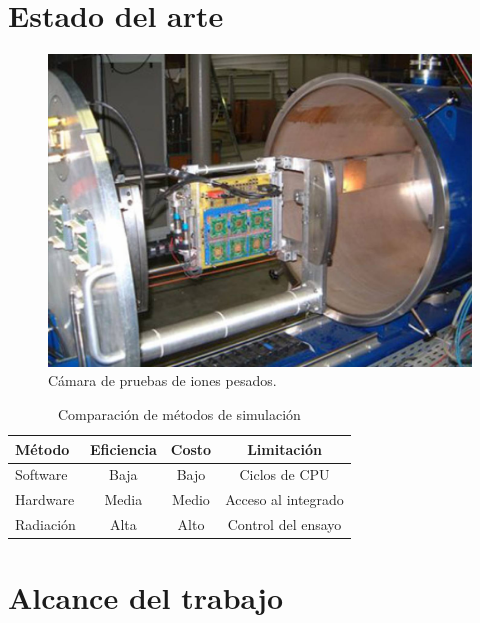 \section{Estado del arte}
\label{sec:arte}

\begin{figure}[htbp]
	\centering
	\includegraphics[width=.8\textwidth]{./Figures/heavy_ion_latchup_tests_in_louvain_la_neuve.jpg}
    \caption{Cámara de pruebas de iones pesados\citep{WEBSITE:heavy_ion}.}
	\label{fig:iones}
\end{figure}

\begin{table}[h]
	\centering
	\caption[Comparación de métodos de simulación]{Comparación de métodos de simulación\citep{ARTICLE:velazco}}
	\begin{tabular}{l c c c}    
		\toprule
        \textbf{Método} & \textbf{Eficiencia} & \textbf{Costo} & \textbf{Limitación}\\
		\midrule
        Software        & Baja                & Bajo           & Ciclos de CPU\\		
        Hardware        & Media               & Medio          & Acceso al integrado\\
        Radiación       & Alta                & Alto           & Control del ensayo\\
		\bottomrule
		\hline
	\end{tabular}
	\label{tab:arte}
\end{table}

\section{Alcance del trabajo}


